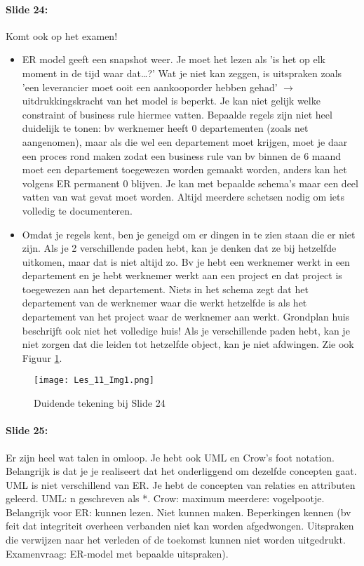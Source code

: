 \documentclass[10pt,a4paper]{report}
\begin{document}
\paragraph{Slide 24:}Komt ook op het examen!
\begin{itemize}
\item ER model geeft een snapshot weer. Je moet het lezen als 'is het op elk moment in de tijd waar dat…?' Wat je niet kan zeggen, is uitspraken zoals 'een leverancier moet ooit een aankooporder hebben gehad' $\rightarrow$ uitdrukkingskracht van het model is beperkt. Je kan niet gelijk welke constraint of business rule hiermee vatten. Bepaalde regels zijn niet heel duidelijk te tonen: bv werknemer heeft 0 departementen (zoals net aangenomen), maar als die wel een departement moet krijgen, moet je daar een proces rond maken zodat een business rule van bv binnen de 6 maand moet een departement toegewezen worden gemaakt worden, anders kan het volgens ER permanent 0 blijven. Je kan met bepaalde schema's maar een deel vatten van wat gevat moet worden. Altijd meerdere schetsen nodig om iets volledig te documenteren.
\item Omdat je regels kent, ben je geneigd om er dingen in te zien staan die er niet zijn. Als je 2 verschillende paden hebt, kan je denken dat ze bij hetzelfde uitkomen, maar dat is niet altijd zo. Bv je hebt een werknemer werkt in een departement en je hebt werknemer werkt aan een project en dat project is toegewezen aan het departement. Niets in het schema zegt dat het departement van de werknemer waar die werkt hetzelfde is als het departement van het project waar de werknemer aan werkt. Grondplan huis beschrijft ook niet het volledige huis! Als je verschillende paden hebt, kan je niet zorgen dat die leiden tot hetzelfde object, kan je niet afdwingen. Zie ook Figuur \ref{Les 11 Img 1}.
\end{itemize}

\begin{figure}[ht!]
\centering
\texttt{[image: Les\_11\_Img1.png]}
\caption{Duidende tekening bij Slide 24 \label{Les 11 Img 1}}
\end{figure}

\paragraph{Slide 25:}Er zijn heel wat talen in omloop. Je hebt ook UML en Crow's foot notation. Belangrijk is dat je je realiseert dat het onderliggend om dezelfde concepten gaat. UML is niet verschillend van ER. Je hebt de concepten van relaties en attributen geleerd. UML: n geschreven als *. Crow: maximum meerdere: vogelpootje.
Belangrijk voor ER: kunnen lezen. Niet kunnen maken. Beperkingen kennen (bv feit dat integriteit overheen verbanden niet kan worden afgedwongen. Uitspraken die verwijzen naar het verleden of de toekomst kunnen niet worden uitgedrukt. Examenvraag: ER-model met bepaalde uitspraken).
\end{document}
